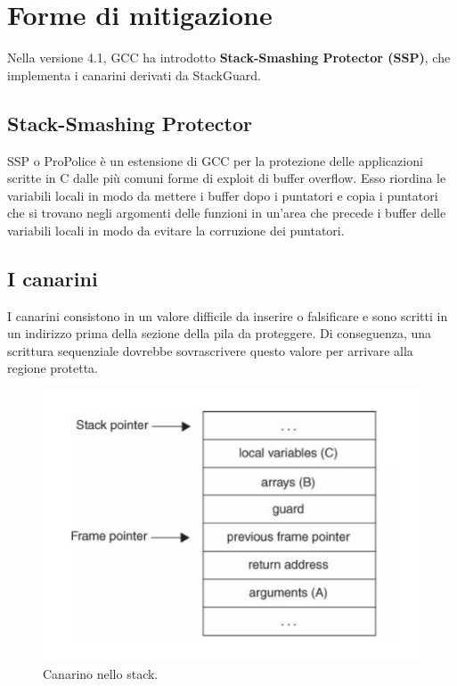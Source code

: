 \newpage
\section{Forme di mitigazione}

Nella versione 4.1, GCC ha introdotto \textbf{Stack-Smashing Protector (SSP)},
che implementa i canarini derivati da StackGuard.

\subsection{Stack-Smashing Protector}

SSP o ProPolice è un estensione di GCC per la protezione delle applicazioni scritte
in C dalle più comuni forme di exploit di buffer overflow. Esso riordina le variabili
locali in modo da mettere i buffer dopo i puntatori e copia i puntatori che si trovano
negli argomenti delle funzioni in un'area che precede i buffer delle variabili locali
in modo da evitare la corruzione dei puntatori.

\subsection{I canarini}

I canarini consistono in un valore difficile da inserire o falsificare e sono scritti
in un indirizzo prima della sezione della pila da proteggere.
Di conseguenza, una scrittura sequenziale dovrebbe sovrascrivere questo valore per
arrivare alla regione protetta.

\begin{figure}[H]
    \centering
    \includegraphics[width=12cm, keepaspectratio]{capitoli/secure_coding/img/cap_3/canarini.png}
    \caption{Canarino nello stack.}\label{fig:canarini}
\end{figure}


